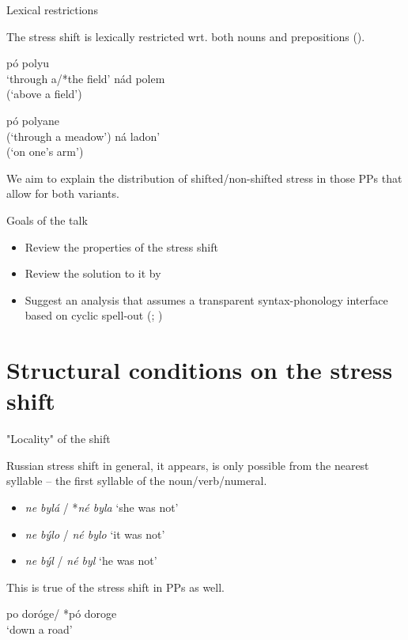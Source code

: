 \documentclass{beamer}
\begin{document}
	\begin{frame}{Lexical restrictions}
	
	The stress shift is lexically restricted wrt. both nouns and prepositions (\cite{Gribanova:2013}).
	
	\begin{minipage}{.49\textwidth}
		\pex\label{ex:basic3}
				\a pó polyu\\
				`through a/*the field'
				\a *nád polem\\
				(`above a field')
		\xe
		\end{minipage}
		\hfill
		\begin{minipage}{.5\textwidth}
		\pex\label{ex:basic4}
				\a *pó polyane\\
				(`through a meadow')
				\a *ná ladon’\\
				(`on one's arm')
		\xe
		\end{minipage}
		
	We aim to explain the distribution of shifted/non-shifted stress in those PPs that allow for both variants.
	
	\end{frame}

	\begin{frame}{Goals of the talk}

		\begin{itemize}
			\item Review the properties of the stress shift
			\item Review the solution to it by \textcite{Gribanova:2013}
			\item Suggest an analysis that assumes a transparent syntax-phonology interface based on cyclic spell-out (\cite{Scheer:2012}; \cite{Scheer:2016})
		\end{itemize}

	\end{frame}

	\section{Structural conditions on the stress shift}

	\begin{frame}{"Locality" of the shift}
	
	Russian stress shift in general, it appears, is only possible from the nearest syllable -- the first syllable of the noun/verb/numeral.
	
	\begin{itemize}
			\item \emph{ne bylá} / *\emph{né byla} `she was not' 
			\item \emph{ne býlo} / \emph{né bylo} `it was not' 
			\item \emph{ne býl} / \emph{né byl} `he was not' 
	\end{itemize}
	
	This is true of the stress shift in PPs as well.
	
		\ex
				po doróge/ *pó doroge\\
				`down a road'
		\xe
	
	\end{frame}
\end{document}
